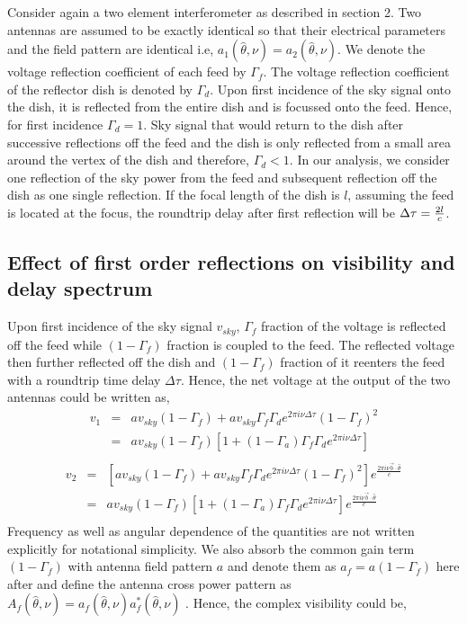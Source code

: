 \documentclass[12pt,preprint]{aastex}
\newcommand{\volt}{{v}}
\newcommand{\bmvolt}{{a}}
\newcommand{\bm}{{A}}
\newcommand{\thhat}{{\hat\theta}}
\newcommand{\fngexp}{{e^{\frac{2\pi i\nu\vec{b}\cdot\thhat}{c}}}}
\newcommand{\dfngexp}{{e^{2\pi i\nu \Delta \tau}}}
\begin{document}
Consider again a two element interferometer as described in section 2. Two antennas are assumed to be exactly identical so that their electrical parameters and the field pattern are identical i.e, $a_{1}(\thhat,\nu) = a_{2}(\thhat,\nu)$. We denote the voltage reflection coefficient of each feed by $\Gamma_{f}$. The voltage reflection coefficient of the reflector dish is denoted by $\Gamma_{d}$. Upon first incidence of the sky signal onto the dish, it is reflected from the entire dish and is focussed onto the feed. Hence, for first incidence $\Gamma_{d}=1$. Sky signal that would return to the dish after successive reflections off the feed and the dish is only reflected from a small area around the vertex of the dish and therefore, $\Gamma_{d}<1$. In our analysis, we consider one reflection of the sky power from the feed and subsequent reflection off the dish as one single reflection. If the focal length of the dish is $l$, assuming the feed is located at the focus, the roundtrip delay after first reflection will be $\Delta \tau = {2l \over c}$. 


\subsection{Effect of first order reflections on visibility and delay spectrum}
Upon first incidence of the sky signal $\volt_{sky}$, $\Gamma_{f}$ fraction of the voltage is reflected off the feed while $(1-\Gamma_{f})$ fraction is coupled to the feed. The reflected voltage then further reflected off the dish and $(1-\Gamma_{f}) $ fraction of it reenters the feed with a roundtrip time delay $\Delta \tau$. Hence, the net voltage at the output of the two antennas could be written as,    
\begin{eqnarray}
\volt_{1} & = & a \volt_{sky}(1-\Gamma_{f}) + a \volt_{sky} \Gamma_{f} \Gamma_{d} \dfngexp  (1-\Gamma_{f})^{2}\nonumber\\
         & = & a \volt_{sky} (1-\Gamma_{f}) \left [ 1+ (1-\Gamma_{a})\Gamma_{f} \Gamma_{d} e^{2\pi i\nu \Delta \tau} \right]\nonumber\\
\label{eq4}
\end{eqnarray}
\begin{eqnarray}
\volt_{2} & = & \left [ a \volt_{sky}(1-\Gamma_{f}) + a \volt_{sky} \Gamma_{f} \Gamma_{d} \dfngexp (1-\Gamma_{f})^{2}\right ] \fngexp \nonumber\\
         & = & a \volt_{sky} (1-\Gamma_{f}) \left [ 1+(1-\Gamma_{a}) \Gamma_{f} \Gamma_{d} \dfngexp  \right] \fngexp \nonumber\\
\label{eq5}
\end{eqnarray}
Frequency as well as angular dependence of the quantities are not written explicitly for notational simplicity. We also absorb the common gain term $(1-\Gamma_{f})$ with antenna field pattern $a$ and denote them as $a_{f}= a(1-\Gamma_{f})$ here after and define the antenna cross power pattern as $\bm_{f}(\thhat,\nu)=\bmvolt_{f}(\thhat,\nu)\bmvolt_{f}^{*}(\thhat,\nu)$ . Hence, the complex visibility could be, 
\end{document}

